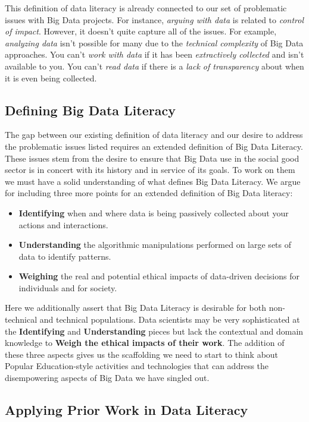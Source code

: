 \documentclass{sig-alternate}
\begin{document}
This definition of data literacy is already connected to our set of problematic issues with Big Data projects.  For instance, \textit{arguing with data} is related to \textit{control of impact}. However, it doesn't quite capture all of the issues.  For example, \textit{analyzing data} isn't possible for many due to the \textit{technical complexity} of Big Data approaches.  You can't \textit{work with data} if it has been \textit{extractively collected} and isn't available to you.  You can't \textit{read data} if there is a \textit{lack of transparency} about when it is even being collected.

\subsection{Defining Big Data Literacy}

The gap between our existing definition of data literacy and our desire to address the problematic issues listed requires an extended definition of Big Data Literacy. These issues stem from the desire to ensure that Big Data use in the social good sector is in concert with its history and in service of its goals.  To work on them we must have a solid understanding of what defines Big Data Literacy. We argue for including three more points for an extended definition of Big Data literacy:
\begin{itemize}
\item \textbf{Identifying} when and where data is being passively collected about your actions and interactions.
\item \textbf{Understanding} the algorithmic manipulations performed on large sets of data to identify patterns.
\item \textbf{Weighing} the real and potential ethical impacts of data-driven decisions for individuals and for society.
\end{itemize}

Here we additionally assert that Big Data Literacy is desirable for both non-technical and technical populations. Data scientists may be very sophisticated at the \textbf{Identifying} and \textbf{Understanding} pieces but lack the contextual and domain knowledge to \textbf{Weigh the ethical impacts of their work}. The addition of these three aspects gives us the scaffolding we need to start to think about Popular Education-style activities and technologies that can address the disempowering aspects of Big Data we have singled out.

\subsection{Applying Prior Work in Data Literacy}
\end{document}
